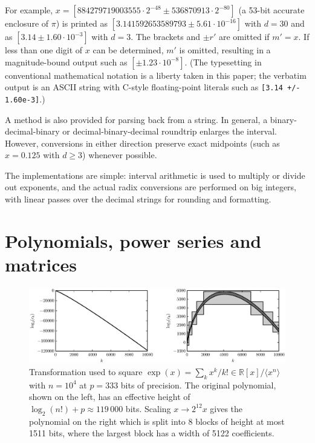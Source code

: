 \documentclass[10pt,journal,compsoc,cspaper]{IEEEtran}
\begin{document}
For example, $x = [884279719003555 \cdot 2^{-48} \pm 536870913 \cdot 2^{-80}]$
(a 53-bit accurate enclosure of $\pi$)
is printed as $[3.141592653589793 \pm 5.61 \cdot 10^{-16}]$ with $d = 30$
and as $[3.14 \pm 1.60 \cdot 10^{-3}]$ with $d = 3$.
The brackets and $\pm r'$ are omitted if $m' = x$. If
less than one digit of $x$ can be determined, $m'$ is omitted,
resulting in a magnitude-bound output such as $[\pm 1.23 \cdot 10^{-8}]$.
(The typesetting in conventional mathematical notation
is a liberty taken in this paper;
the verbatim output is an ASCII string
with C-style floating-point literals such as \texttt{[3.14 +/- 1.60e-3]}.)

A method is also provided for parsing back from a string.
In general, a binary-decimal-binary or decimal-binary-decimal
roundtrip enlarges the interval. However, conversions in either direction
preserve exact midpoints (such as $x = 0.125$ with $d \ge 3$) whenever possible.

The implementations are simple: interval
arithmetic is used to multiply or divide out exponents, and the
actual radix conversions are performed on big integers, with
linear passes over the decimal strings for rounding and formatting.

\section{Polynomials, power series and matrices}
\label{sect:polynomials}

\begin{figure}[!htb]
\centering
\includegraphics[scale=0.63]{polymul.eps}
\caption{Transformation used to square
$\exp(x) = \sum_k x^k / k! \in \mathbb{R}[x] / \langle x^n \rangle$
with $n = 10^4$ at $p = 333$ bits of precision.
The original polynomial, shown on the left, has an effective height of $\log_2(n!) + p \approx 119\,000$ bits.
Scaling $x \to 2^{12} x$ gives the polynomial on the right which
is split into 8 blocks of height at most 1511 bits, where the largest
block has a width of 5122 coefficients.}
\label{fig:digraph}
\end{figure}
\end{document}
